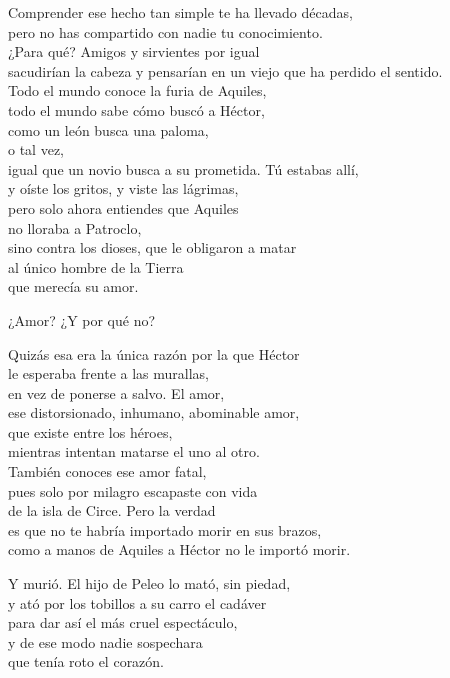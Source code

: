 \begin{versopropio}
Comprender ese hecho tan simple te ha llevado décadas,\\
pero no has compartido con nadie tu conocimiento.\\
¿Para qué? Amigos y sirvientes por igual\\
sacudirían la cabeza y pensarían en un viejo que ha perdido el sentido.\\
Todo el mundo conoce la furia de Aquiles,\\
todo el mundo sabe cómo buscó a Héctor,\\
como un león busca una paloma,\\
o tal vez,\\
igual que un novio busca a su prometida. Tú estabas allí,\\
y oíste los gritos, y viste las lágrimas,\\
pero solo ahora entiendes que Aquiles\\
no lloraba a Patroclo,\\
sino contra los dioses, que le obligaron a matar\\
al único hombre de la Tierra\\
que merecía su amor.
\end{versopropio}

¿Amor? ¿Y por qué no?

\begin{versopropio}
Quizás esa era la única razón por la que Héctor\\
le esperaba frente a las murallas,\\
en vez de ponerse a salvo. El amor,\\
ese distorsionado, inhumano, abominable amor,\\
que existe entre los héroes,\\
mientras intentan matarse el uno al otro.\\
También conoces ese amor fatal,\\
pues solo por milagro escapaste con vida\\
de la isla de Circe. Pero la verdad\\
es que no te habría importado morir en sus brazos,\\
como a manos de Aquiles a Héctor no le importó morir.
\end{versopropio}

\begin{versopropio}
Y murió. El hijo de Peleo lo mató, sin piedad,\\
y ató por los tobillos a su carro el cadáver\\
para dar así el más cruel espectáculo,\\
y de ese modo nadie sospechara\\
que tenía roto el corazón.
\end{versopropio}


